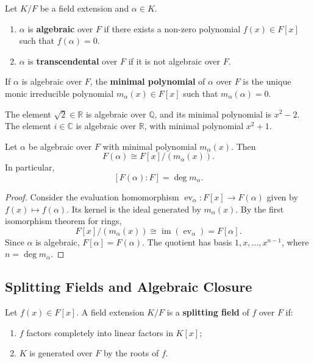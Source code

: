 \begin{definition}
Let $K/F$ be a field extension and $\alpha\in K$.
\begin{enumerate}
    \item $\alpha$ is \textbf{algebraic} over $F$ if there exists a non-zero polynomial $f(x)\in F[x]$ such that $f(\alpha)=0$.
    \item $\alpha$ is \textbf{transcendental} over $F$ if it is not algebraic over $F$.
\end{enumerate}
\end{definition}

\begin{definition}
If $\alpha$ is algebraic over $F$, the \textbf{minimal polynomial} of $\alpha$ over $F$ is the unique monic irreducible polynomial $m_\alpha(x)\in F[x]$ such that $m_\alpha(\alpha)=0$.
\end{definition}

\begin{example}
The element $\sqrt{2}\in\mathbb{R}$ is algebraic over $\mathbb{Q}$, and its minimal polynomial is $x^2-2$. The element $i\in\mathbb{C}$ is algebraic over $\mathbb{R}$, with minimal polynomial $x^2+1$.
\end{example}

\begin{theorem}
Let $\alpha$ be algebraic over $F$ with minimal polynomial $m_\alpha(x)$. Then
\[
    F(\alpha)\cong F[x]/(m_\alpha(x)).
\]
In particular,
\[
    [F(\alpha):F]=\deg m_\alpha.
\]
\end{theorem}

\begin{proof}
Consider the evaluation homomorphism $\operatorname{ev}_\alpha:F[x]\to F(\alpha)$ given by $f(x)\mapsto f(\alpha)$. Its kernel is the ideal generated by $m_\alpha(x)$. By the first isomorphism theorem for rings,
\[
    F[x]/(m_\alpha(x))\cong \operatorname{im}(\operatorname{ev}_\alpha)=F[\alpha].
\]
Since $\alpha$ is algebraic, $F[\alpha]=F(\alpha)$. The quotient has basis $1,x,\dots,x^{n-1}$, where $n=\deg m_\alpha$.
\end{proof}

\subsection{Splitting Fields and Algebraic Closure}

\begin{definition}
Let $f(x)\in F[x]$. A field extension $K/F$ is a \textbf{splitting field} of $f$ over $F$ if:
\begin{enumerate}
    \item $f$ factors completely into linear factors in $K[x]$;
    \item $K$ is generated over $F$ by the roots of $f$.
\end{enumerate}
\end{definition}

